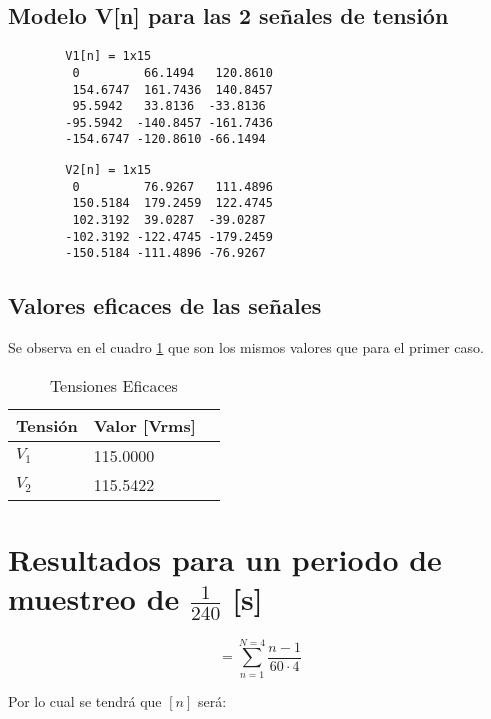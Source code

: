 \documentclass[conference]{IEEEtran}
\theoremstyle{mytheoremstyle}
\theoremstyle{mytheoremstyle}
\theoremstyle{myproblemstyle}
\begin{document}
    \subsection{Modelo V[n] para las 2 señales de tensión}

        \begin{verbatim}
        V1[n] = 1x15    
         0         66.1494   120.8610  
         154.6747  161.7436  140.8457   
         95.5942   33.8136  -33.8136  
        -95.5942  -140.8457 -161.7436 
        -154.6747 -120.8610 -66.1494 
        \end{verbatim}


        \begin{verbatim}
        V2[n] = 1x15    
         0         76.9267   111.4896  
         150.5184  179.2459  122.4745  
         102.3192  39.0287  -39.0287 
        -102.3192 -122.4745 -179.2459 
        -150.5184 -111.4896 -76.9267
        \end{verbatim}

        \subsection{Valores eficaces de las señales}
        Se observa en el cuadro \ref{tab:tensiones1} que son los mismos valores que para el primer caso.
        \begin{table}[h]
            \centering
            \caption{Tensiones Eficaces}
            \begin{tabular}{@{}lll@{}}
            \toprule
            Tensión & Valor [Vrms] \\ \midrule
            $V_1$   & 115.0000     \\
            $V_2$   & 115.5422     \\ \bottomrule
            \end{tabular}
            \label{tab:tensiones1}
        \end{table}



        \section{Resultados para un periodo de muestreo de \texorpdfstring{$\frac{1}{240}$}{1/240} [s]}
        \begin{equation}
            [n] = \sum_{n=1}^{N=4} \frac{n-1}{60 \cdot 4}
        \end{equation}
        
        Por lo cual se tendrá que $[n]$ será:
        
\end{document}
